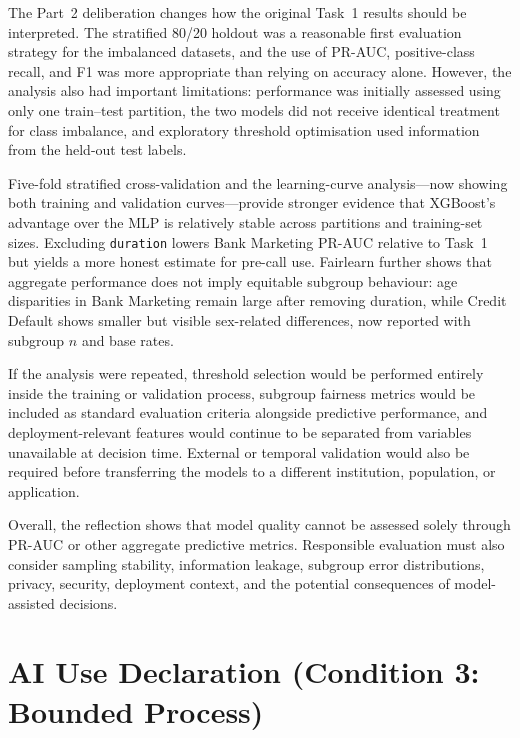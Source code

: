 The Part~2 deliberation changes how the original Task~1 results should be interpreted.
The stratified 80/20 holdout was a reasonable first evaluation strategy for the
imbalanced datasets, and the use of PR-AUC, positive-class recall, and F1 was more
appropriate than relying on accuracy alone. However, the analysis also had important
limitations: performance was initially assessed using only one train--test partition,
the two models did not receive identical treatment for class imbalance, and exploratory
threshold optimisation used information from the held-out test labels.

Five-fold stratified cross-validation and the learning-curve analysis---now showing
both training and validation curves---provide stronger evidence that XGBoost's
advantage over the MLP is relatively stable across partitions and training-set sizes.
Excluding \texttt{duration} lowers Bank Marketing PR-AUC relative to Task~1 but yields
a more honest estimate for pre-call use. Fairlearn further shows that aggregate
performance does not imply equitable subgroup behaviour: age disparities in Bank
Marketing remain large after removing duration, while Credit Default shows smaller but
visible sex-related differences, now reported with subgroup $n$ and base rates.

If the analysis were repeated, threshold selection would be performed entirely inside
the training or validation process, subgroup fairness metrics would be included as
standard evaluation criteria alongside predictive performance, and deployment-relevant
features would continue to be separated from variables unavailable at decision time.
External or temporal validation would also be required before transferring the models
to a different institution, population, or application.

Overall, the reflection shows that model quality cannot be assessed solely through
PR-AUC or other aggregate predictive metrics. Responsible evaluation must also consider
sampling stability, information leakage, subgroup error distributions, privacy,
security, deployment context, and the potential consequences of model-assisted
decisions.


\newpage

\section{AI Use Declaration (Condition 3: Bounded Process)}
\label{sec:ai-declaration}

